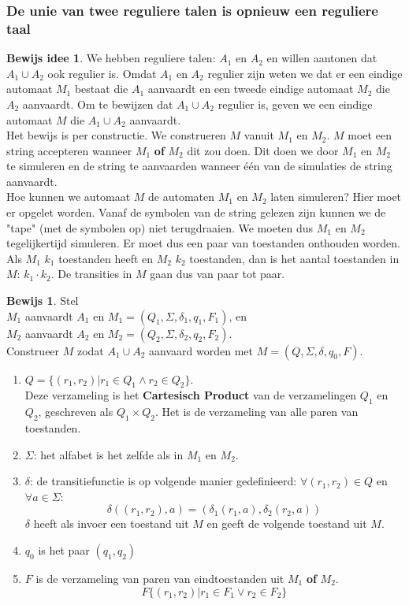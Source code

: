 \documentclass[12pt,a4paper]{article}
\theoremstyle{definition}
\newtheorem{bIdee}{Bewijs idee}[section]
\newtheorem{bewijs}{Bewijs}[section]
\begin{document}
\subsubsection{De unie van twee reguliere talen is opnieuw een reguliere taal}
\begin{bIdee}
We hebben reguliere talen: $A_1$ en $A_2$ en willen aantonen dat $A_1 \cup A_2$ ook regulier is. Omdat $A_1$ en $A_2$ regulier zijn weten we dat er een eindige automaat $M_1$ bestaat die $A_1$ aanvaardt en een tweede eindige automaat $M_2$ die $A_2$ aanvaardt. Om te bewijzen dat $A_1 \cup A_2$ regulier is, geven we een eindige automaat $M$ die $A_1 \cup A_2$ aanvaardt.\\
Het bewijs is per constructie. We construeren $M$ vanuit $M_1$ en $M_2$. $M$ moet een string accepteren wanneer $M_1$ \textbf{of} $M_2$ dit zou doen. Dit doen we door $M_1$ en $M_2$ te simuleren en de string te aanvaarden wanneer één van de simulaties de string aanvaardt.\\
Hoe kunnen we automaat $M$ de automaten $M_1$ en $M_2$ laten simuleren? Hier moet er opgelet worden. Vanaf de symbolen van de string gelezen zijn kunnen we de "tape" (met de symbolen op) niet terugdraaien. We moeten dus $M_1$ en $M_2$ tegelijkertijd simuleren. Er moet dus een paar van toestanden onthouden worden. Als $M_1$ $k_1$ toestanden heeft en $M_2$ $k_2$ toestanden, dan is het aantal toestanden in $M$: $k_1 \cdot k_2$. De transities in $M$ gaan dus van paar tot paar. 
\end{bIdee}
\newpage
\begin{bewijs}
Stel \\
$M_1$ aanvaardt $A_1$ en $M_1 = (Q_1,\Sigma,\delta_1,q_1,F_1)$, en \\
$M_2$ aanvaardt $A_2$ en $M_2 = (Q_2,\Sigma,\delta_2,q_2,F_2)$.\\

Construeer $M$ zodat $A_1 \cup A_2$ aanvaard worden met $M = (Q,\Sigma,\delta,q_0,F)$.\\
\begin{enumerate}
\item $Q=\{(r_1,r_2)|r_1 \in Q_1 \wedge r_2 \in Q_2\}$.\\
Deze verzameling is het \textbf{Cartesisch Product} van de verzamelingen $Q_1$ en $Q_2$, geschreven als $Q_1 \times Q_2$. Het is de verzameling van alle paren van toestanden.
\item $\Sigma$: het alfabet is het zelfde als in $M_1$ en $M_2$.
\item $\delta$: de transitiefunctie is op volgende manier gedefinieerd: $\forall (r_1,r_2) \in Q$ en $\forall a\in \Sigma$: 
$$\delta((r_1,r_2),a) = (\delta_1(r_1,a),\delta_2(r_2,a))$$
$\delta$ heeft als invoer een toestand uit $M$ en geeft de volgende toestand uit $M$.
\item $q_0$ is het paar $(q_1,q_2)$
\item $F$ is de verzameling van paren van eindtoestanden uit $M_1$ \textbf{of} $M_2$. $$F  \{(r_1,r_2)|r_1\in F_1 \vee r_2 \in F_2\}$$
\end{enumerate}
\end{bewijs}
\newpage
\end{document}

